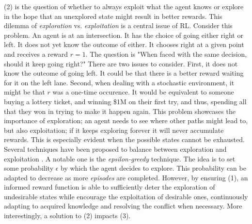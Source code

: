 \documentclass[a4paper,11pt]{article}
\theoremstyle{definition}
\begin{document}
(2) is the question of whether to always exploit what the
agent knows or explore in the hope that an unexplored state might
result in better rewards. This dilemma of \emph{exploration} vs. \emph{exploitation} is a central issue of RL. Consider this problem. An agent is at an intersection. It has the choice of going either right or left. 
It does not yet know the outcome of either. It chooses right at a given point and receives a reward $r=1$. The question is "When faced with the same decision, should it keep going right?" There are two issues to consider. 
First, it does not know the outcome of going left. It could be that there is a better reward waiting for it on the left lane. Second, when dealing with a stochastic environment, it might be that $r$ was a one-time occurence. 
It would be equivalent to someone buying a lottery ticket, and winning
\$1M on their first try, and thus, spending all that they won in trying to make it happen again. This problem showcases the importance of exploration; an agent 
needs to see where other paths might lead to, but also exploitation; if it keeps exploring forever it will never accumulate rewards. This is especially evident when the possible states cannot be exhausted. Several techniques have been proposed 
to balance between exploration and exploitation \cite{Kaelbling1996ReinforcementLA}. A notable one is the \emph{epsilon-greedy} technique. The idea is to set some probability $\epsilon$ by which the agent decides to explore. This probability can be adapted 
to decrease as more \emph{episodes} are completed. However, by ensuring (1), an informed reward function is able to sufficiently 
deter the exploration of undesirable states while encourage the exploitation of desirable ones, continuously adapting to 
acquired knowledge and resolving the conflict when necessary. More interestingly, a solution to (2) impacts (3). 


\medskip
\end{document}
